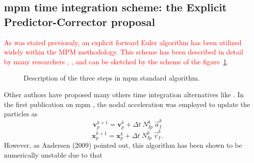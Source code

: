 \documentclass[preprint,12pt,a4paper]{elsarticle}
\newcommand{\vect}[1]{
  \ensuremath{\mathbf{{#1}}}
}
\newcommand{\PNA}[1]{
  \textcolor{red}{{#1}}
}
\begin{document}
\subsection{\acrshort{mpm} time integration scheme: the Explicit Predictor-Corrector proposal}
\label{sec:epc-algor-mpm}

\PNA{As was stated previosuly, an explicit forward Euler algorithm has been utilized widely within the \acrshort{MPM} methodology. This scheme has been described in detail by many researchers
\cite{Sulsky1994}, \cite{Bardenhagen2002}, \cite{thesis_Andersen_2009} and can be sketched by the scheme of the figure~\ref{fig:MPM_algorithm}.}
\begin{figure}\sidecaption
  \centering
  \caption{Description of the three steps in \acrshort{mpm} standard algorithm.}
  \label{fig:MPM_algorithm}
\end{figure}
Other authors have proposed many others time integration alternatives
like \cite{Guilkey_2003,Charlton_2017,Tran2019e}. In the
first publication on \acrshort{mpm} \cite{Sulsky1994}, the nodal acceleration
was employed to update the particles as
\begin{equation}
  \label{eq:Sulsky-1994-UL-v}
  \vect{v}_p^{k+1} = \vect{v}_p^{k} + \Delta t\ N_{Ip}^{k}\ \vec{a}_{I}^{k}
\end{equation}
\begin{equation}
  \label{eq:Sulsky-1994-UL-x}
  \vect{x}_p^{k+1} = \vect{x}_p^{k} + \Delta t\ N_{Ip}^{k}\ \vec{v}_{I}^{k}.
\end{equation}
However, as Andersen (2009)\cite{thesis_Andersen_2009} pointed out, this algorithm has been shown to be numerically unstable due to that
\end{document}
